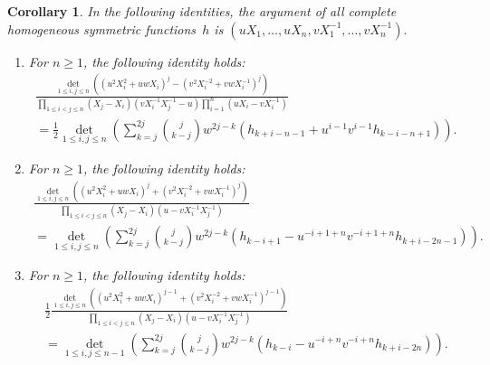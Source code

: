 \documentclass[12pt]{amsart}
\newtheorem{cor}[theorem]{Corollary}
\theoremstyle{definition}
\numberwithin{equation}{section}
\begin{document}
	
	\begin{cor} 
		\label{jacobitrudi3cor}
		In the following identities, the argument of all complete homogeneous symmetric functions~$h$ is $(u X_1,\ldots,u X_n,v X_1^{-1},\ldots,v X_n^{-1}).$
		\begin{enumerate}
			\item\label{cor:jacobitrudi3cor1} For $n \ge 1$, the following identity holds: 
			\begin{multline*}
				\frac{
					\det_{1 \le i,j \le n} \left( \left(u^2 X_i^2 + u w X_i\right)^j - \left(v^2 X_i^{-2} + v w X_i^{-1}\right)^j \right)}
				{\prod_{1 \le i < j \le n} (X_j-X_i)(v X_i^{-1} X_j^{-1}-u) \prod_{i=1}^{n} (u X_i -v X_i^{-1})} \\
				=
				\frac{1}{2} \det_{1 \le i,j \le n} \left(  \sum_{k=j}^{2j} \binom{j}{k-j} w^{2j-k} 
				(h_{k+i-n-1} + u^{i-1} v^{i-1} h_{k-i-n+1} )  \right). 
			\end{multline*} 
			\item\label{cor:jacobitrudi3cor2}For $n \ge 1$, the following identity holds:
			\begin{multline*}
				\frac{
					\det_{1 \le i,j \le n} \left( \left(u^2 X_i^2 + u w X_i\right)^j + \left(v^2 X_i^{-2} + v w X_i^{-1}\right)^j \right)}
				{\prod_{1 \le i < j \le n} (X_j-X_i)(u- v X_i^{-1} X_j^{-1})} \\ 
				=
				\det_{1 \le i, j \le n } \left( \sum_{k=j}^{2j} \binom{j}{k-j} w^{2j-k}  \left(  h_{k-i+1} - u^{-i+1+n} v^{-i+1+n} h_{k+i-2n-1} \right) \right).
			\end{multline*} 
			\item\label{cor:jacobitrudi3cor3} For $n \ge 1$, the following identity holds:
			\begin{multline*}
				\frac{1}{2}  \frac{\det_{1 \le i,j \le n} \left( \left(u^2 X_i^2 + u w X_i\right)^{j-1} + \left(v^2 X_i^{-2} + v w X_i^{-1}\right)^{j-1} \right)}
				{\prod_{1 \le i < j \le n} (X_j-X_i)(u - v X_i^{-1} X_j^{-1})} \\
				=
				\det_{1 \le i, j \le n-1} \left( \sum_{k=j}^{2j} \binom{j}{k-j} w^{2j-k}  \left( h_{k-i} - u^{-i+n} v^{-i+n} h_{k+i-2n} \right) \right).
			\end{multline*} 
		\end{enumerate} 
	\end{cor} 
	
\end{document}

